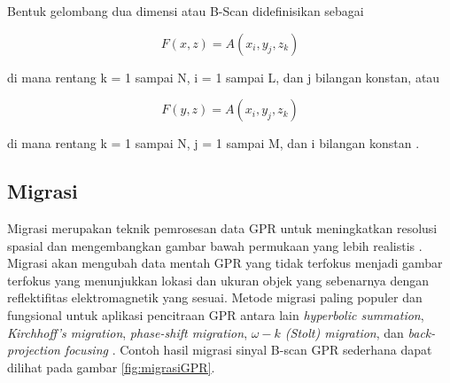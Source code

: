 Bentuk gelombang dua dimensi atau B-Scan didefinisikan sebagai

\begin{equation}
  \label{eq:Bscanx}
  F(x,z)=A( x_{i} , y_{j} , z_{k} )
\end{equation}

di mana rentang k = 1 sampai N, i = 1 sampai L, dan j bilangan konstan, atau

\begin{equation}
  \label{eq:Bscany}
  F(y,z)=A( x_{i} , y_{j} , z_{k} )
\end{equation}

di mana rentang k = 1 sampai N, j = 1 sampai M, dan i bilangan konstan \parencite{danielDvd}.

\subsection{Migrasi}
\label{subsec:migrasi}

Migrasi merupakan teknik pemrosesan data GPR untuk meningkatkan resolusi spasial dan mengembangkan gambar bawah permukaan yang lebih realistis \parencite{jol2008ground}.
Migrasi akan mengubah data mentah GPR yang tidak terfokus menjadi gambar terfokus yang menunjukkan lokasi dan ukuran objek yang sebenarnya dengan reflektifitas elektromagnetik yang sesuai.
Metode migrasi paling populer dan fungsional untuk aplikasi pencitraan GPR antara lain \emph{hyperbolic summation}, \emph{Kirchhoff's migration}, \emph{phase-shift migration}, \emph{$\omega-k$ (Stolt) migration}, dan \emph{back-projection focusing} \parencite{Ozdemir2014ARO}.
Contoh hasil migrasi sinyal B-scan GPR sederhana dapat dilihat pada gambar \ref{fig:migrasiGPR}.

